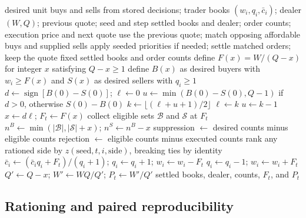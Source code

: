 \begin{algorithm}[!ht]
\caption{Uniform-price reserve clearing without a cost-basis restriction.
The binary search found the greatest supported integer net purchase in
the direction of initial excess demand.}
\label{alg:dealer-clearing}
\begin{algorithmic}[1]
\REQUIRE desired unit buys and sells from stored decisions; trader books
$(w_i,q_i,\bar c_i)$; dealer $(W,Q)$; previous quote; seed and step
\ENSURE settled books and dealer; order counts; execution price and next quote
 \STATE use the previous quote; match opposing affordable buys and supplied sells
 \STATE apply seeded priorities if needed; settle matched orders; keep the quote fixed
 \RETURN settled books and order counts
\ENDIF
\STATE define $F(x)=W/(Q-x)$ for integer $x$ satisfying $Q-x\geq1$
\STATE define $B(x)$ as desired buyers with $w_i\geq F(x)$ and $S(x)$ as desired sellers with $q_i\geq1$
\STATE $d\leftarrow\operatorname{sign}[B(0)-S(0)]$; $\ell\leftarrow0$
\STATE $u\leftarrow\min(B(0)-S(0),Q-1)$ if $d>0$, otherwise $S(0)-B(0)$
 \STATE $k\leftarrow\lfloor(\ell+u+1)/2\rfloor$
  \STATE $\ell\leftarrow k$
 \ELSE
  \STATE $u\leftarrow k-1$
 \ENDIF
\ENDWHILE
\STATE $x\leftarrow d\ell$; $F_t\leftarrow F(x)$
\STATE collect eligible sets $\mathcal{B}$ and $\mathcal{S}$ at $F_t$
\STATE $n^B\leftarrow\min(|\mathcal{B}|,|\mathcal{S}|+x)$; $n^S\leftarrow n^B-x$
\STATE suppression $\leftarrow$ desired counts minus eligible counts
\STATE rejection $\leftarrow$ eligible counts minus executed counts
\STATE rank any rationed side by $z(\mathrm{seed},t,i,\mathrm{side})$, breaking ties by identity
 \STATE $\bar c_i\leftarrow(\bar c_iq_i+F_t)/(q_i+1)$;
 $q_i\leftarrow q_i+1$; $w_i\leftarrow w_i-F_t$
\ENDFOR
{}
 \STATE $q_i\leftarrow q_i-1$; $w_i\leftarrow w_i+F_t$
\ENDFOR
\STATE $Q'\leftarrow Q-x$; $W'\leftarrow WQ/Q'$; $P_t\leftarrow W'/Q'$
\RETURN settled books, dealer, counts, $F_t$, and $P_t$
\end{algorithmic}
\end{algorithm}

\FloatBarrier

\subsection{Rationing and paired reproducibility}

